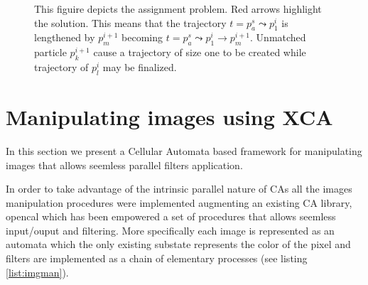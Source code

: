 \documentclass[conference]{IEEEtran}
\begin{document}
\begin{figure}
\caption{This figuire depicts the assignment problem. Red arrows highlight the solution. This means that the trajectory $t=p^s_a \leadsto p^i_1$  is lengthened by $p^{i+1}_m$ becoming $t=p^s_a \leadsto p^i_1 \to p^{i+1}_m$. Unmatched particle $p^{i+1}_k$ cause a  trajectory of size one to be created while trajectory of $p^{i}_l$ may be finalized.} \label{match}
\end{figure}



\section{Manipulating images using XCA}
In this section we present a Cellular Automata based framework for manipulating images that allows seemless parallel filters application.


	In order to take advantage of the intrinsic parallel nature of CAs all the images manipulation procedures were implemented augmenting an existing CA library, opencal\cite{dambrosio:2016} \cite{opencalurl} \cite{opencalmanual} which has been empowered  a set of procedures that allows seemless input/ouput and filtering.
	More specifically each image is represented as an automata which the only existing substate represents the color of the pixel and filters are implemented as a chain of elementary processes (see listing \ref{list:imgman}).
\end{document}

